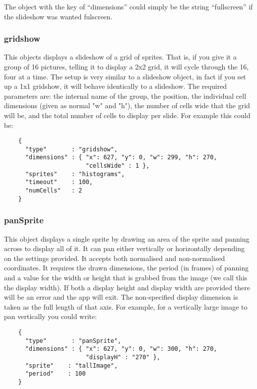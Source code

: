 \documentclass[a4paper]{article}
\begin{document}
  The object with the key of ``dimensions'' could simply be the string
  ``fullscreen'' if the slideshow was wanted fulscreen.

  \subsubsection{gridshow}
  This objects displays a slideshow of a grid of sprites. That is, if you
  give it a group of 16 pictures, telling it to display a 2x2 grid, it will
  cycle through the 16, four at a time. The setup is very similar to a
  slideshow object, in fact if you set up a 1x1 gridshow, it will behave
  identically to a slideshow.
  The required parameters are: the internal name of the group, the position,
  the individual cell dimensions (given as normal "w" and "h"), the number
  of cells wide that the grid will be, and the total number of cells to 
  display per slide. For example this could be:

  \begin{verbatim}
    {
      "type"       : "gridshow",
      "dimensions" : { "x": 627, "y": 0, "w": 299, "h": 270, 
                       "cellsWide" : 1 },
      "sprites"    : "histograms",
      "timeout"    : 100,
      "numCells"   : 2
    }  
  \end{verbatim}

  \subsubsection{panSprite}
  This object displays a single sprite by drawing an area of the sprite and
  panning across to display all of it. It can pan either vertically or
  horizontally depending on the settings provided. It accepts both
  normalised and non-normalised coordinates. It requires the drawn
  dimensions, the period (in frames) of panning and a value for the width
  or height that is grabbed from the image (we call this the display width).
  If both a display height and display width are provided there will be an
  error and the app will exit. The non-specified display dimension is taken
  as the full length of that axis. For example, for a vertically large image
  to pan vertically you could write:


  \begin{verbatim}
    {
      "type"       : "panSprite",
      "dimensions" : { "x": 627, "y": 0, "w": 300, "h": 270, 
                       "displayH" : "270" },
      "sprite"    : "tallImage",
      "period"    : 100
    }  
  \end{verbatim}
\end{document}
